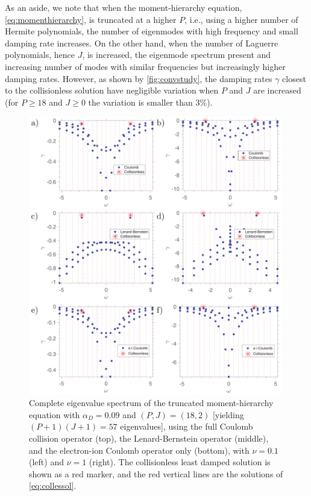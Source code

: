 As an aside, we note that when the moment-hierarchy equation, \cref{eq:momenthierarchy}, is truncated at a higher $P$, i.e., using a higher number of Hermite polynomials, the number of eigenmodes with high frequency and small damping rate increases.
%
On the other hand, when the number of Laguerre polynomials, hence $J$, is increased, the eigenmode spectrum present and increasing number of modes with similar frequencies but increasingly higher damping rates.
%
However, as shown by \cref{fig:convstudy}, the damping rates $\gamma$ closest to the collisionless solution have negligible variation when $P$ and $J$ are increased (for $P\ge18$ and $J\ge0$ the variation is smaller than 3\%).
%
\begin{figure}
    \centering
    \includegraphics[width=0.99\textwidth]{images/Eigenvalue_Spectra.pdf}
    \caption{{Complete} eigenvalue spectrum of the truncated moment-hierarchy equation with $\alpha_D=0.09$ and $(P,J)=(18,2)$  {[yielding $(P+1)(J+1)=57$ eigenvalues]}, using the full Coulomb collision operator (top), the Lenard-Bernstein operator (middle), and the electron-ion Coulomb operator only (bottom), with $\nu=0.1$ (left) and $\nu=1$ (right). The collisionless {least damped} solution is shown as a red marker, and the red vertical lines are the solutions of \cref{eq:collessol}.}
    \label{fig:coulroots}
\end{figure}

